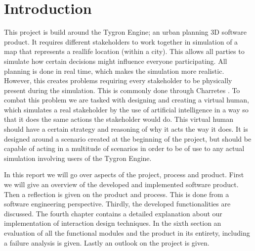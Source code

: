 \section{Introduction}

This project is build around the Tygron Engine; an urban planning 3D software product. It requires different stakeholders to work together in simulation of a map that represents a reallife location (within a city). This allows all parties to simulate how certain decisions might influence everyone participating. All planning is done in real time, which makes the simulation more realistic. However, this creates problems requiring every stakeholder to be physically present during the simulation. This is commonly done through Charretes \cite{Todd13}. To combat this problem we are tasked with designing and creating a virtual human, which simulates a real stakeholder by the use of artificial intelligence in a way so that it does the same actions the stakeholder would do. This virtual human should have a certain strategy and reasoning of why it acts the way it does. It is designed around a scenario created at the beginning of the project, but should be capable of acting in a multitude of scenarios in order to be of use to any actual simulation involving users of the Tygron Engine.

In this report we will go over aspects of the project, process and product.\newline
First we will give an overview of the developed and implemented software product. Then a reflection is given on the product and process. This is done from a software engineering perspective. Thirdly, the developed functionalities are discussed. The fourth chapter contains a detailed explanation about our implementation of interaction design techniques. In the sixth section an evaluation of all the functional modules and the product in its entirety, including a failure analysis is given. Lastly an outlook on the project is given.